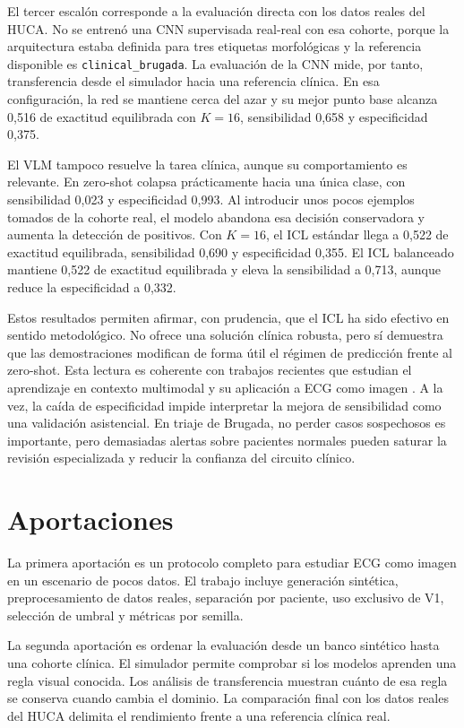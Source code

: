 El tercer escalón corresponde a la evaluación directa con los datos reales del HUCA. No se entrenó una CNN supervisada real-real con esa cohorte, porque la arquitectura estaba definida para tres etiquetas morfológicas y la referencia disponible es \texttt{clinical\_brugada}. La evaluación de la CNN mide, por tanto, transferencia desde el simulador hacia una referencia clínica. En esa configuración, la red se mantiene cerca del azar y su mejor punto base alcanza 0,516 de exactitud equilibrada con \(K=16\), sensibilidad 0,658 y especificidad 0,375.

El VLM tampoco resuelve la tarea clínica, aunque su comportamiento es relevante. En zero-shot colapsa prácticamente hacia una única clase, con sensibilidad 0,023 y especificidad 0,993. Al introducir unos pocos ejemplos tomados de la cohorte real, el modelo abandona esa decisión conservadora y aumenta la detección de positivos. Con \(K=16\), el ICL estándar llega a 0,522 de exactitud equilibrada, sensibilidad 0,690 y especificidad 0,355. El ICL balanceado mantiene 0,522 de exactitud equilibrada y eleva la sensibilidad a 0,713, aunque reduce la especificidad a 0,332.

Estos resultados permiten afirmar, con prudencia, que el ICL ha sido efectivo en sentido metodológico. No ofrece una solución clínica robusta, pero sí demuestra que las demostraciones modifican de forma útil el régimen de predicción frente al zero-shot. Esta lectura es coherente con trabajos recientes que estudian el aprendizaje en contexto multimodal y su aplicación a ECG como imagen \cite{alayrac2022,camba2026icl,chen2024,zhang2024mmicl}. A la vez, la caída de especificidad impide interpretar la mejora de sensibilidad como una validación asistencial. En triaje de Brugada, no perder casos sospechosos es importante, pero demasiadas alertas sobre pacientes normales pueden saturar la revisión especializada y reducir la confianza del circuito clínico.

\section{Aportaciones}

La primera aportación es un protocolo completo para estudiar ECG como imagen en un escenario de pocos datos. El trabajo incluye generación sintética, preprocesamiento de datos reales, separación por paciente, uso exclusivo de V1, selección de umbral y métricas por semilla.

La segunda aportación es ordenar la evaluación desde un banco sintético hasta una cohorte clínica. El simulador permite comprobar si los modelos aprenden una regla visual conocida. Los análisis de transferencia muestran cuánto de esa regla se conserva cuando cambia el dominio. La comparación final con los datos reales del HUCA delimita el rendimiento frente a una referencia clínica real.

